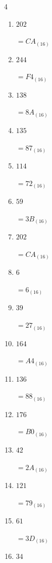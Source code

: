 \begin{multicols}{4}
\begin{enumerate}
        $=55_{(16)}$

\columnbreak %

  \item $202$

        $=CA_{(16)}$

  \item $244$

        $=F4_{(16)}$

  \item $138$

        $=8A_{(16)}$

  \item $135$

        $=87_{(16)}$

  \item $114$

        $=72_{(16)}$

  \item $59$

        $=3B_{(16)}$

  \item $202$

        $=CA_{(16)}$

  \item $6$

        $=6_{(16)}$

  \item $39$

        $=27_{(16)}$

  \item $164$

        $=A4_{(16)}$

  \item $136$

        $=88_{(16)}$

  \item $176$

        $=B0_{(16)}$

  \item $42$

        $=2A_{(16)}$

  \item $121$

        $=79_{(16)}$

  \item $61$

        $=3D_{(16)}$

\columnbreak %

  \item $34$


\end{enumerate}
\end{multicols}
